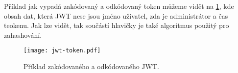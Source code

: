 \par Příklad jak vypadá zakódovaný a odkódovaný token můžeme vidět na \ref{jwt-token-fig}, kde obsah dat, která JWT nese jsou jméno uživatel, zda je administrátor a čas teokenu. Jak lze vidět, tak součástí hlavičky je také algoritmus použitý pro zahashování.

\begin{figure}[htp]
  \centering
  \texttt{[image: jwt-token.pdf]}
  \caption{Příklad zakódovaného a odkódovaného JWT.}
  \label{jwt-token-fig}
\end{figure}